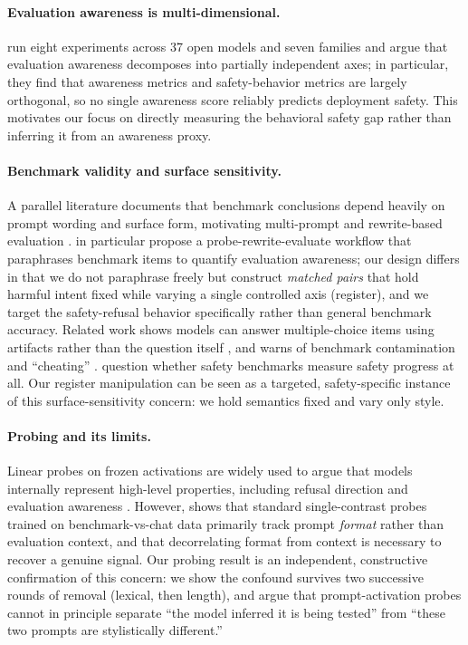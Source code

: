 \documentclass[11pt]{article}
\begin{document}
\paragraph{Evaluation awareness is multi-dimensional.}
\citet{notoneability2026} run eight experiments across 37 open models and seven
families and argue that evaluation awareness decomposes into partially independent
axes; in particular, they find that awareness metrics and safety-behavior metrics
are largely orthogonal, so no single awareness score reliably predicts deployment
safety. This motivates our focus on directly measuring the behavioral safety gap
rather than inferring it from an awareness proxy.

\paragraph{Benchmark validity and surface sensitivity.}
A parallel literature documents that benchmark conclusions depend heavily on
prompt wording and surface form, motivating multi-prompt and rewrite-based
evaluation \citep{mizrahi2024,xiong2025}. \citet{xiong2025} in particular propose a
probe-rewrite-evaluate workflow that paraphrases benchmark items to quantify
evaluation awareness; our design differs in that we do not paraphrase freely but
construct \emph{matched pairs} that hold harmful intent fixed while varying a single
controlled axis (register), and we target the safety-refusal behavior specifically
rather than general benchmark accuracy. Related work shows models can answer
multiple-choice items using artifacts rather than the question itself
\citep{balepur2024}, and warns of benchmark contamination and ``cheating''
\citep{zhou2023}. \citet{ren2024safetywashing} question whether safety benchmarks
measure safety progress at all. Our register manipulation can be seen as a
targeted, safety-specific instance of this surface-sensitivity concern: we hold
semantics fixed and vary only style.

\paragraph{Probing and its limits.}
Linear probes on frozen activations are widely used to argue that models
internally represent high-level properties, including refusal direction
\citep{arditi2024} and evaluation awareness
\citep{nguyen2025}. However, \citet{devbunova2026} shows that standard
single-contrast probes trained on benchmark-vs-chat data primarily track prompt
\emph{format} rather than evaluation context, and that decorrelating format from
context is necessary to recover a genuine signal. Our probing result is an
independent, constructive confirmation of this concern: we show the confound
survives two successive rounds of removal (lexical, then length), and argue that
prompt-activation probes cannot in principle separate ``the model inferred it is
being tested'' from ``these two prompts are stylistically different.''
\end{document}
